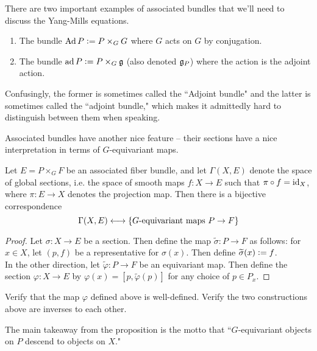 %
\begin{exmp}
There are two important examples of associated bundles that we'll need to discuss
the Yang-Mills equations.
\begin{enumerate}
  \item The bundle $\operatorname{Ad} P \vcentcolon= P \times_G G$ where $G$ acts on $G$ by conjugation.
  \item The bundle $\operatorname{ad} P \vcentcolon= P \times_G \mathfrak{g}$ (also denoted $\mathfrak{g}_P$) where
  the action is the adjoint action.
\end{enumerate}
Confusingly, the former is sometimes called the ``Adjoint bundle" and the
latter is sometimes called the ``adjoint bundle," which makes it admittedly
hard to distinguish between them when speaking.
\end{exmp}
%
Associated bundles have another nice feature -- their sections have
a nice interpretation in terms of $G$-equivariant maps.
%
\begin{prop}
Let $E = P \times_G F$ be an associated fiber bundle, and let
$\Gamma(X,E)$ denote the space of global sections, i.e. the space of
smooth maps $f : X \to E$ such that $\pi \circ f = \operatorname{id}_X$, where
$\pi : E \to X$ denotes the projection map. Then there is a bijective correspondence
\[
\Gamma(X,E) \longleftrightarrow \left\lbrace G\text{-equivariant maps } P \to F \right\rbrace
\]
\end{prop}
%
\begin{proof}
Let $\sigma : X \to E$ be a section. Then define the map
$\widetilde{\sigma} : P \to F$ as follows: for $x \in X$, let $(p,f)$ be a
representative for $\sigma(x)$. Then define $\widetilde{\sigma}(x) \vcentcolon= f$. \\

In the other direction, let $\widetilde{\varphi} : P \to F$ be an equivariant
map. Then define the section $\varphi : X \to E$ by
$\varphi(x) = [p,\widetilde{\varphi}(p)]$ for any choice of $p \in P_x$.
\end{proof}
%
\begin{exer}
Verify that the map $\varphi$ defined above is well-defined. Verify the two
constructions above are inverses to each other.
\end{exer}
%
The main takeaway from the proposition is the motto that ``$G$-equivariant
objects on $P$ descend to objects on $X$." \\

